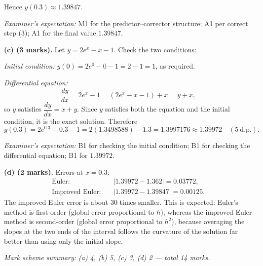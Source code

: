\documentclass[11pt]{article}
\begin{document}
\begin{corrige}
Hence $y(0.3) \approx 1.39847$.

\emph{Examiner's expectation:} M1 for the predictor--corrector structure; A1 per correct step (3); A1 for the final value $1.39847$.

\textbf{(c) (3 marks).} Let $y = 2e^x - x - 1$. Check the two conditions:

\emph{Initial condition:} $y(0) = 2e^0 - 0 - 1 = 2 - 1 = 1$, as required.

\emph{Differential equation:}
\[ \frac{dy}{dx} = 2e^x - 1 = (2e^x - x - 1) + x = y + x, \]
so $y$ satisfies $\dfrac{dy}{dx} = x + y$. Since $y$ satisfies both the equation and the initial condition, it is the exact solution. Therefore
\[ y(0.3) = 2e^{0.3} - 0.3 - 1 = 2(1.3498588) - 1.3 = 1.3997176 \approx 1.39972 \quad (5\ \text{d.p.}). \]

\emph{Examiner's expectation:} B1 for checking the initial condition; B1 for checking the differential equation; B1 for $1.39972$.

\textbf{(d) (2 marks).} Errors at $x = 0.3$:
\begin{align*}
\text{Euler:}\quad & |1.39972 - 1.362| = 0.03772,\\
\text{Improved Euler:}\quad & |1.39972 - 1.39847| = 0.00125.
\end{align*}
The improved Euler error is about $30$ times smaller. This is expected: Euler's method is first-order (global error proportional to $h$), whereas the improved Euler method is second-order (global error proportional to $h^2$), because averaging the slopes at the two ends of the interval follows the curvature of the solution far better than using only the initial slope.

\emph{Mark scheme summary: (a) 4, (b) 5, (c) 3, (d) 2 — total 14 marks.}
\end{corrige}
\end{document}
